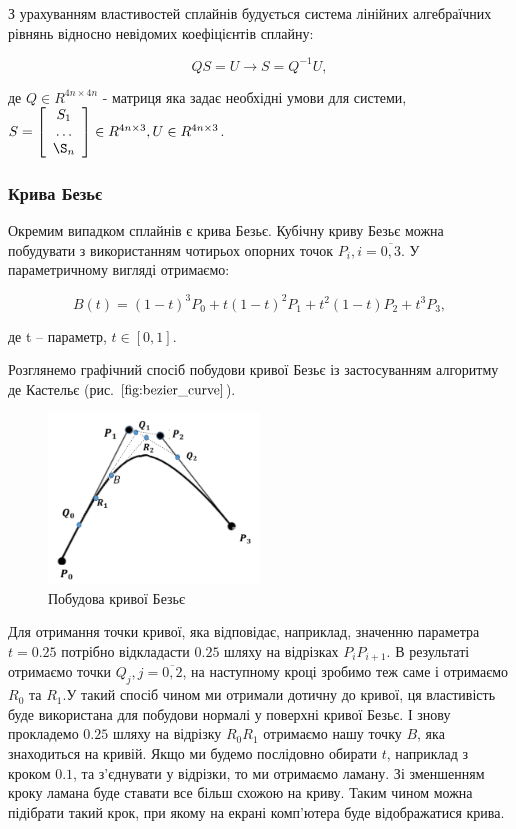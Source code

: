 \let\mypdfximage\pdfximage\def\pdfximage{\immediate\mypdfximage}\documentclass[14pt,a4paper]{extarticle}
\theoremstyle{definition}
\renewcommand{\[}{\begin{singlespace}\begin{equation*}}
\renewcommand{\]}{\end{equation*}\end{singlespace}}
\renewcommand{\+}{\discretionary{\mbox{\scriptsize$\hookleftarrow$}}{}{}}
\begin{document}
З урахуванням властивостей сплайнів будується система лінійних алгебраїчних рівнянь відносно невідомих коефіцієнтів сплайну:
\[QS=U \to S=Q^{-1}U,\]
де $Q\in R^{4n\times4n}$ - матриця яка задає необхідні умови для системи, 
$S=\left[\begin{array}{c}S_1\\\dots\\\S_n\end{array}\right]\in R^{4n\times3}, U \in R^{4n\times3}$.

\subsubsection{Крива Безьє}

Окремим випадком сплайнів є крива Безьє. Кубічну криву Безьє можна побудувати з використанням чотирьох опорних точок $P_i, i=\overline{0,3}$. У параметричному вигляді отримаємо:
\[B(t)=(1-t)^3P_0+t(1-t)^2P_1+t^2(1-t)P_2+t^3P_3,\]
де t -- параметр, $t \in [0,1]$.

Розглянемо графічний спосіб побудови кривої Безьє із застосуванням алгоритму де Кастельє (рис. $\ref{fig:bezier_curve}$).

\begin{figure}[!htb]
    \centering
    \includegraphics[width=0.5\textwidth]{bezier-curve.png}
    \caption{Побудова кривої Безьє}\label{fig:bezier_curve}
\end{figure}

Для отримання точки кривої, яка відповідає, наприклад, значенню параметра $t=0.25$ потрібно відкладасти $0.25$ шляху на відрізках $P_iP_{i+1}$. В результаті отримаємо точки $Q_{j}, j=\overline{0,2}$, на наступному кроці зробимо теж саме і отримаємо $R_0$ та $R_1$.У такий спосіб чином ми отримали дотичну до кривої, ця властивість буде використана для побудови нормалі у поверхні кривої Безьє. І знову прокладемо $0.25$ шляху на відрізку $R_0R_1$ отримаємо нашу точку $B$, яка знаходиться на кривій. Якщо ми будемо послідовно обирати $t$, наприклад з кроком $0.1$, та з'єднувати у відрізки, то ми отримаємо ламану. Зі зменшенням кроку ламана буде ставати все більш схожою на криву. Таким чином можна підібрати такий крок, при якому на екрані комп'ютера буде відображатися крива.
\end{document}
